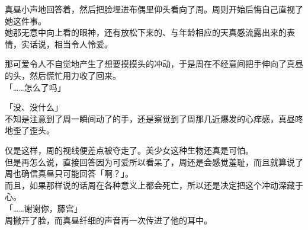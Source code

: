 真昼小声地回答着，然后把脸埋进布偶里仰头看向了周。周则开始后悔自己直视了她这件事。\\

她那无意中向上看的眼神，还有放松下来的、与年龄相应的天真感流露出来的表情，实话说，相当令人怜爱。

那可爱令人不自觉地产生了想要摸摸头的冲动，于是周在不经意间把手伸向了真昼的头，然后慌忙用力收了回来。\\

「……怎么了吗」

「没、没什么」\\

不知是注意到了周一瞬间动了的手，还是察觉到了周那几近爆发的心痒感，真昼咚地歪了歪头。

仅是这样，周的视线便差点被夺走了。美少女这种生物还真是可怕。\\

但是再怎么说，直接回答因为可爱所以看呆了，周还是会感觉羞耻，而且就算说了周也确信真昼只可能回答「啊？」。\\

而且，如果那样说的话周在各种意义上都会死亡，所以还是决定把这个冲动深藏于心。\\

「……谢谢你，藤宫」\\

周撇开了脸，而真昼纤细的声音再一次传进了他的耳中。

